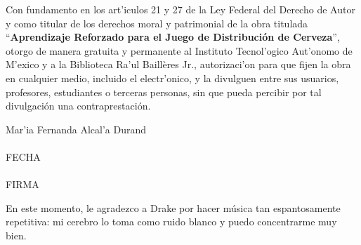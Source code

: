 
\newpage
\mbox{}
\thispagestyle{empty} %

\newpage
\thispagestyle{empty}
Con fundamento en los art'iculos 21 y 27 de la Ley Federal del
Derecho de Autor y como titular de los derechos moral y patrimonial de la obra titulada ``\textbf{Aprendizaje Reforzado para el Juego de Distribuci\'on de Cerveza}'', otorgo de manera gratuita y permanente al Instituto Tecnol'ogico Aut'onomo de M'exico y a la Biblioteca Ra'ul Baill\`eres Jr., autorizaci'on para que fijen la obra en cualquier medio, incluido el electr'onico, y la divulguen entre sus usuarios, profesores, estudiantes o terceras personas, sin que pueda percibir por tal divulgación una contraprestación.

\vspace{20 mm}
\begin{center}
Mar'ia Fernanda Alcal'a Durand\\

\vspace{20 mm}
\makebox[2in]{\hrulefill}\\
FECHA\\
\vspace{20 mm}
\makebox[2in]{\hrulefill}\\
FIRMA
\end{center}

\newpage
\mbox{}
\thispagestyle{empty} %



En este momento, le agradezco a Drake por hacer m\'usica tan espantosamente repetitiva: mi cerebro lo toma como ruido blanco y puedo concentrarme muy bien.

\newpage
\mbox{}
\thispagestyle{empty} %
